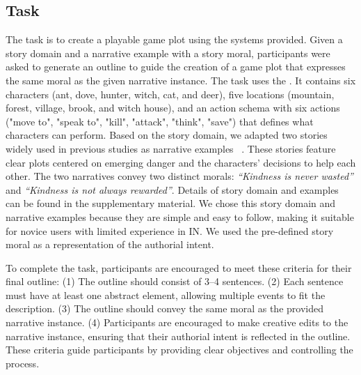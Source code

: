\subsection{Task}
The task is to create a playable game plot using the systems provided.
Given a story domain and a narrative example with a story moral, participants were asked to generate an outline to guide the creation of a game plot that expresses the same moral as the given narrative instance.
The task uses the . It contains six characters (ant, dove, hunter, witch, cat, and deer), five locations (mountain, forest, village, brook, and witch house), and an action schema with six actions ("move to", "speak to", "kill", "attack", "think", "save") that defines what characters can perform. 
Based on the story domain, we adapted two stories widely used in previous studies as narrative examples  ~\cite{suwartini2019culture,affendi2018elements}. These stories feature clear plots centered on emerging danger and the characters' decisions to help each other. The two narratives convey two distinct morals: \textit{``Kindness is never wasted''} and \textit{``Kindness is not always rewarded''}. Details of story domain and examples can be found in the supplementary material. We chose this story domain and narrative examples because they are simple and easy to follow, making it suitable for novice users with limited experience in IN. We used the pre-defined story moral as a representation of the authorial intent.

To complete the task, participants are encouraged to meet these criteria for their final outline: (1) The outline should consist of 3–4 sentences. (2) Each sentence must have at least one abstract element, allowing multiple events to fit the description. (3) The outline should convey the same moral as the provided narrative instance. (4) Participants are encouraged to make creative edits to the narrative instance, ensuring that their authorial intent is reflected in the outline. These criteria guide participants by providing clear objectives and controlling the process.


